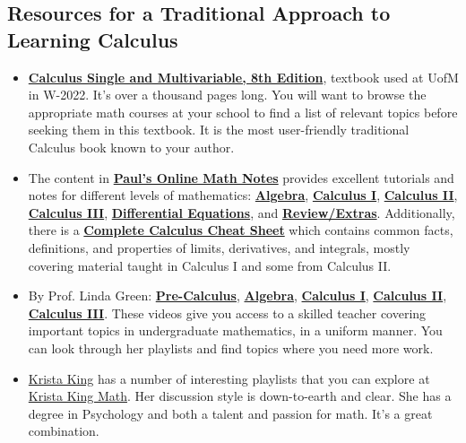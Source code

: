 \subsection{Resources for a Traditional Approach to Learning Calculus}
\begin{itemize}
\item \href{https://bookshelf.vitalsource.com/#/books/9781119694298}{\bf Calculus Single and Multivariable, 8th Edition}, textbook used at UofM in W-2022. It's over a thousand pages long. You will want to browse the appropriate math courses at your school to find a list of relevant topics before seeking them in this textbook. It is the most user-friendly traditional Calculus book known to your author. 

\item The content in \href{https://tutorial.math.lamar.edu/}{\bf Paul's Online Math Notes} provides excellent tutorials and notes for different levels of mathematics: \href{https://tutorial.math.lamar.edu/classes/alg/alg.aspx}{\textbf{Algebra}},
\href{https://tutorial.math.lamar.edu/classes/calcI/calcI.aspx}{\textbf{Calculus I}},
\href{https://tutorial.math.lamar.edu/classes/calcII/calcII.aspx}{\textbf{Calculus II}},
\href{https://tutorial.math.lamar.edu/classes/calcIII/calcIII.aspx}{\textbf{Calculus III}},
\href{https://tutorial.math.lamar.edu/classes/de/de.aspx}{\textbf{Differential Equations}},
and \href{https://tutorial.math.lamar.edu/Extras/Review/Review.aspx}{\textbf{Review/Extras}}. Additionally, there is a \href{https://tutorial.math.lamar.edu/cheat_table.aspx}{\textbf{Complete Calculus Cheat Sheet}} which contains common facts, definitions, and properties of limits, derivatives, and integrals, mostly covering material taught in Calculus I and some from Calculus II.

\item By Prof. Linda Green:  \href{https://www.youtube.com/playlist?list=PLAEgL_CQRjwSn81I91DFQQ7LMMUgd1lH9}{\bf Pre-Calculus}, \href{https://www.youtube.com/playlist?list=PLAEgL_CQRjwSK844Tmveev_UM2B0BvERL}{\bf Algebra}, \href{https://www.youtube.com/playlist?list=PLAEgL_CQRjwTgfzOcbuq3zB724ZP8I2ql}{\bf Calculus I}, \href{https://www.youtube.com/playlist?list=PLAEgL_CQRjwT6CNQm6c2B0mklLz-N45u-}{\bf Calculus II}, \href{https://www.youtube.com/playlist?list=PLAEgL_CQRjwTF3iqXIUKZvnaLHnZav0bv}{\bf Calculus III}. These videos give you access to a skilled teacher covering important topics in undergraduate mathematics, in a uniform manner. You can look through her playlists and find topics where you need more work.

\item \href{https://www.kristakingmath.com/about-krista}{Krista King} has a number of interesting playlists that you can explore at \href{https://www.youtube.com/@kristakingmath/playlists}{Krista King Math}. Her discussion style is down-to-earth and clear. She has a degree in Psychology and both a talent and passion for math. It's a great combination. 

\end{itemize}

